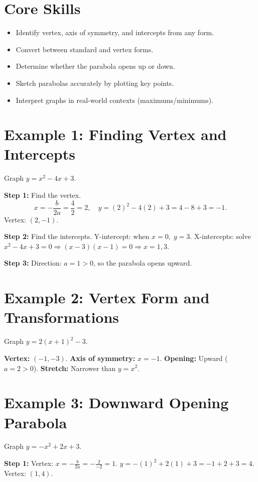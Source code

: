 \documentclass[14pt]{extarticle}
\begin{document}
\section*{Core Skills}
\begin{itemize}
  \item Identify vertex, axis of symmetry, and intercepts from any form.
  \item Convert between standard and vertex forms.
  \item Determine whether the parabola opens up or down.
  \item Sketch parabolas accurately by plotting key points.
  \item Interpret graphs in real-world contexts (maximums/minimums).
\end{itemize}

\section*{Example 1: Finding Vertex and Intercepts}

Graph \(y = x^2 - 4x + 3.\)

\textbf{Step 1:} Find the vertex.  
\[
x = -\frac{b}{2a} = \frac{4}{2} = 2, \quad y = (2)^2 - 4(2) + 3 = 4 - 8 + 3 = -1.
\]
Vertex: \((2, -1)\).

\textbf{Step 2:} Find the intercepts.  
Y-intercept: when \(x = 0,\; y = 3.\)  
X-intercepts: solve \(x^2 - 4x + 3 = 0 \Rightarrow (x - 3)(x - 1) = 0 \Rightarrow x = 1, 3.\)

\textbf{Step 3:} Direction: \(a = 1 > 0\), so the parabola opens upward.

\section*{Example 2: Vertex Form and Transformations}

Graph \(y = 2(x + 1)^2 - 3.\)

\textbf{Vertex:} \((-1, -3)\).  
\textbf{Axis of symmetry:} \(x = -1.\)  
\textbf{Opening:} Upward (\(a = 2 > 0\)).  
\textbf{Stretch:} Narrower than \(y = x^2.\)

\section*{Example 3: Downward Opening Parabola}

Graph \(y = -x^2 + 2x + 3.\)

\textbf{Step 1:} Vertex: \(x = -\frac{b}{2a} = -\frac{2}{-2} = 1.\)  
\(y = -(1)^2 + 2(1) + 3 = -1 + 2 + 3 = 4.\)  
Vertex: \((1, 4)\).
\end{document}
